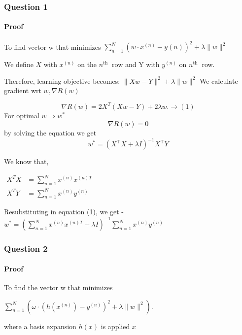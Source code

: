 \documentclass[11pt]{article}
\begin{document}
    \hypertarget{question-1}{%
\subsubsection{Question 1}\label{question-1}}

    \hypertarget{proof}{%
\paragraph{Proof}\label{proof}}

    To find vector w that minimizes
\(\sum_{n=1}^{N}\left(w \cdot x^{(n)}-y(n)\right)^{2}+\lambda\|w\|^{2}\)

We define \(X\) with \(x^{(n)}\) on the \(n^{\text {th }}\) row and Y
with \(y^{(n)}\) on \(n^{\text {th }}\) row.

Therefore, learning objective becomes:
\(\|X w-Y\|^{2}+\lambda\|w\|^{2}\) We calculate gradient wrt
\(w, \nabla R(w)\)

\[
\nabla R(w)=2 X^ T(X w-Y)+2 \lambda w . \rightarrow(1)
\] For optimal \(w \Rightarrow w^{*}\) \[
\nabla R(w)=0
\] by solving the equation we get \[
w^{*}=\left(X^{\top} X+\lambda I\right)^{-1} X^{\top} Y
\]

We know that,

\(\begin{aligned} X^T X &=\sum_{n=1}^{N} x^{(n)} x^{(n)T} \\ X^T Y &=\sum_{n=1}^{N} x^{(n)} y^{(n)} \end{aligned}\)

Resubstituting in equation (1), we get -
\(w^{*}=\left(\sum_{n=1}^{N} x^{(n)} x^{(n) T}+\lambda I\right)^{-1} \sum_{n=1}^{N} x^{(n)} y^{(n)}\)

\newpage

    \hypertarget{question-2}{%
\subsubsection{Question 2}\label{question-2}}

    \hypertarget{proof}{%
\paragraph{Proof}\label{proof}}

    To find the vector w that minimizes

\(\sum_{n=1}^{N}\left(\omega \cdot \left(h(x^{(n)})-y^{(n)}\right)^{2}+\lambda\|w\|^{2}\right).\)

where a basis expansion \(h(x)\) is applied \(x\)
\end{document}

